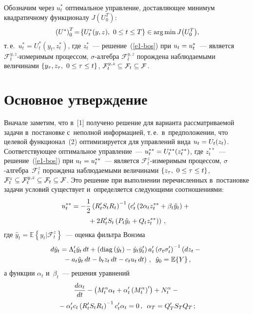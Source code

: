 \begin{multicols}{2}
     Обозначим через $u_t^*$ оптимальное управление, доставляющее 
минимум квадратичному функционалу $J(U_0^T)$:
     \begin{equation}
 \left( U^*\right)_0^T\! =\!\left\{ U_t^*(y,z),\ 0\leq t\leq T\right\} \in \mathop{\mathrm{arg}\,\mathrm{min}} 
J\!\left( U_0^T\right)\!,\!
     \label{e3-bos}
     \end{equation} 
т.\,е.\ $u_t^*=U_t^*(y_t, z_t^*)$, где $z_t^*$~--- решение~(\ref{e1-bos}) при 
$u_t\hm= u_t^*$~--- является $\mathcal{F}_t^{y,z}$-из\-ме\-ри\-мым процессом, 
$\sigma$-ал\-геб\-ра $\mathcal{F}_t^{y,z}$ порождена наблюдаемыми величинами 
$\{y_\tau, z_\tau,\ 0\hm\leq \tau\hm\leq t\}$, $\mathcal{F}_t^{y,z}\hm\subseteq 
\mathcal{F}_t\hm\subseteq \mathcal{F}$.

\section{Основное утверждение}

     Вначале заметим, что в~[1] получено решение для варианта 
рассматриваемой задачи в~постановке с~неполной информацией, т.\,е.\ 
в~предположении, что целевой функционал~(2) оптимизируется для 
управлений вида $u_t\hm= U_t(z_t)$. Со\-от\-вет\-ст\-ву\-ющее оптимальное 
управление~--- $u_t^{**}\hm= U_t^{**}(z_t^{**})$, где $z_t^{**}$~--- 
решение~(\ref{e1-bos}) при $u_t\hm= u_t^{**}$~--- является  
$\mathcal{F}_t^z$-из\-ме\-ри\-мым процессом, $\sigma$-ал\-геб\-ра~$\mathcal{F}_t^z$ 
порождена наблюдаемыми величинами $\{z_\tau, \ 0\hm\leq\tau\hm\leq t\}$, 
$\mathcal{F}_t^z\hm\subseteq \mathcal{F}_t^{y,z}\hm\subseteq \mathcal{F}_t\hm\subseteq 
\mathcal{F}$. Это решение при выполнении перечисленных в~постановке задачи 
условий существует и~определяется следующими соотношениями:
     \begin{multline*}
     u_t^{**}= -\displaystyle\frac{\displaystyle 1\mathstrut}{\displaystyle 2\mathstrut} \left( R^\prime_t S_t R_t\right)^{-1} \left( c_t^\prime 
\left( 2\alpha_t z_t^{**}+\beta_t \hat{y}_t\right) +{}\right.\\
\left.{}+2R_t^\prime S_t\left( P_t 
\hat{y}_t +Q_t z_t^{**}\right)\right)\,,
\end{multline*}
где $\hat{y}_t=\mathbb{E}\left\{ y_t\vert \mathcal{F}_t^z\right\}$~--- оценка 
фильтра Вонэма
\begin{multline}
d\hat{y}_t= \Lambda_t^\prime \hat{y}_t\,dt +\left(\mathrm{diag}\,(\hat{y}_t)-
\hat{y}_t \hat{y}_t^\prime \right) a_t^\prime \left(\sigma_t 
\sigma_t^\prime\right)^{-1} \left( dz_t -{}\right.\\
\left.{}-a_t \hat{y}_t \,dt -b_t z_t\, dt -c_t u_t \,dt\right)\,,\enskip
\hat{y}_0=\mathbb{E}\{Y\}\,,
\label{e5-bos}
\end{multline}
а функции $\alpha_t$ и~$\beta_t$~--- решения уравнений
\begin{multline}
\displaystyle\frac{\displaystyle d\alpha_t\mathstrut}{\displaystyle dt\mathstrut}-\left( M_t^{\alpha} \alpha_t +\alpha_t^\prime \left( 
M_t^\alpha\right)^\prime \right) +N_t^\alpha -{}\\
{}- \alpha_t^\prime c_t \left( R_t^\prime S_t R_t\right)^{-1} c_t^\prime 
\alpha_t=0\,,\enskip \alpha_T= Q_T^\prime S_T Q_T\,;
\label{e6-bos}
\end{multline}


\end{multicols}
